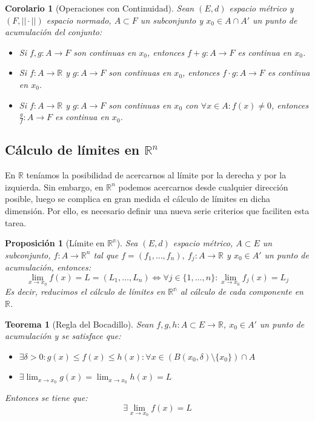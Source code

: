 \documentclass[10pt,a4paper,openright]{book}
\theoremstyle{break}
\newtheorem*{theo}{Teorema}
\newtheorem*{coro}{Corolario}
\newtheorem*{prop}{Proposición}
\begin{document}
\begin{coro}[Operaciones con Continuidad]
Sean $(E,d)$ espacio métrico y $(F, || \cdot ||)$ espacio normado, $A \subset F$ un subconjunto y $x_0 \in A \cap A'$ un punto de acumulación del conjunto:
\begin{itemize}
\item Si $f, g : A \to F$ son continuas en $x_0$, entonces $f + g: A \to F$ es continua en $x_0$.
\item Si $f: A \to \mathbb{R}$ y $g : A \to F$ son continuas en $x_0$, entonces $f \cdot g: A \to F$ es continua en $x_0$.
\item  Si $f: A \to \mathbb{R}$ y $g : A \to F$ son continuas en $x_0$ con $\forall x \in A: f(x) \neq 0$, entonces $\displaystyle \frac{g}{f}: A \to F$ es continua en $x_0$.
\end{itemize}
\end{coro}

\subsection{Cálculo de límites en $\mathbb{R}^n$}
En $\mathbb{R}$ teníamos la posibilidad de acercarnos al límite por la derecha y por la izquierda. Sin embargo, en $\mathbb{R}^n$ podemos acercarnos desde cualquier dirección posible, luego se complica en gran medida el cálculo de límites en dicha dimensión. Por ello, es necesario definir una nueva serie criterios que faciliten esta tarea.

\begin{prop}[Límite en $\mathbb{R^{n}}$]
Sea $(E,d)$ espacio métrico, $A \subset E$ un subconjunto, $f : A \to \mathbb{R}^n$ tal que $f = (f_1, \ldots , f_n),\ f_j : A \to \mathbb{R}$ y $x_0 \in A'$ un punto de acumulación, entonces:
$$\lim_{x \to x_0} f(x) = L = (L_1, \ldots, L_n)\Leftrightarrow \forall j \in \{ 1, \ldots, n\} : \lim_{x \to x_0} f_j (x)= L_j$$
Es decir, reducimos el cálculo de límites en $\mathbb{R^n}$ al cálculo de cada componente en $\mathbb{R}$.
\end{prop}

\begin{theo}[Regla del Bocadillo]
Sean $f,g,h : A \subset E \longrightarrow \mathbb{R}$, $x_0 \in A'$ un punto de acumulación y se satisface que:
\begin{itemize}
\item $\exists \delta > 0 : g(x) \leq f(x) \leq h(x) : \forall x \in \left( B(x_0, \delta) \setminus \{x_0\} \right) \cap A$
\item $\exists \lim_{x \to x_0} g(x) = \lim_{x \to x_0} h(x) = L$
\end{itemize}
Entonces se tiene que:
$$\exists \lim_{x \to x_0} f(x) = L$$
\end{theo}
\end{document}
